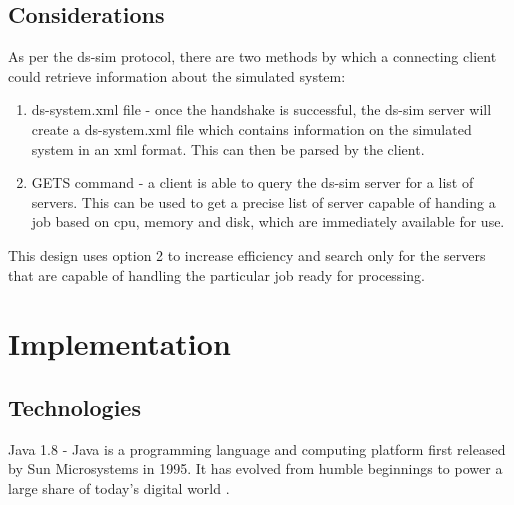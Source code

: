 \documentclass[a4paper]{article}
\begin{document}
\subsection{Considerations}
As per the ds-sim protocol, there are two methods by which a connecting client could retrieve information about the simulated system:
\begin{enumerate}
  \item ds-system.xml file - once the handshake is successful, the ds-sim server will create a ds-system.xml file which contains information on the simulated system in an xml format. This can then be parsed by the client.
  \item GETS command - a client is able to query the ds-sim server for a list of servers. This can be used to get a precise list of server capable of handing a job based on cpu, memory and disk, which are immediately available for use.
\end{enumerate}

This design uses option 2 to increase efficiency and search only for the servers that are capable of handling the particular job ready for processing. 


\section{Implementation}
\label{sec:section4}
\subsection{Technologies}
Java 1.8 - Java is a programming language and computing platform first released by Sun Microsystems in 1995. It has evolved from humble beginnings to power a large share of today’s digital world \cite{java}.
\end{document}
